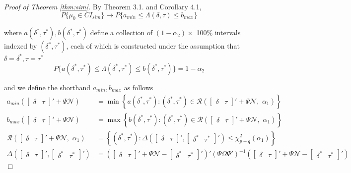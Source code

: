 \begin{proof}[Proof of Theorem \ref{thm:sim}]
By Theorem 3.1. and Corollary 4.1, 
\[
P\{ \mu_0 \in CI_{sim}\} \rightarrow P\{ a_{min} \leq \Lambda(\delta, \tau) \leq b_{max}\}
\]

where $a(\delta^{*}, \tau^{*}), b(\delta^{*}, \tau^{*})$ define a collection of $(1-\alpha_2) \times $ 100\% intervals indexed by $(\delta^{*}, \tau^{*})$, each of which is constructed under the assumption that $\delta=\delta^{*}, \tau=\tau^{*}$
\[
P\{a(\delta^{*},\tau^{*}) \leq \Lambda(\delta^{*}, \tau^{*})\leq b(\delta^{*}, \tau^{*})\} = 1-\alpha_2
\]

and we define the shorthand $a_{min}, b_{max}$ as follows
\begin{align*}
a_{min}\left( \begin{bmatrix}
\delta & \tau
\end{bmatrix}' + \Psi \mathscr{N} \right) &= \min\left \{ a(\delta^{*}, \tau^{*}): (\delta^{*}, \tau^{*}) \in \mathscr{R} \left( \begin{bmatrix}
\delta & \tau
\end{bmatrix}' + \Psi \mathscr{N}, \,\, \alpha_1 \right)  \right \}\\
b_{max}\left( \begin{bmatrix}
\delta & \tau
\end{bmatrix}' + \Psi \mathscr{N} \right) &= \max\left \{ b(\delta^{*}, \tau^{*}): (\delta^{*}, \tau^{*}) \in \mathscr{R} \left( \begin{bmatrix}
\delta & \tau
\end{bmatrix}' + \Psi \mathscr{N}, \,\, \alpha_1 \right)  \right \}\\
\mathscr{R}\left( \begin{bmatrix}
\delta & \tau
\end{bmatrix}' + \Psi \mathscr{N}, \,\, \alpha_1 \right ) &= \left \{ (\delta^{*}, \tau^{*}): \Delta \left( \begin{bmatrix}
\delta & \tau
\end{bmatrix}', \begin{bmatrix}
\delta^{*} & \tau^{*}
\end{bmatrix}' \right) \leq \chi_{p+q}^2(\alpha_1) \right \}\\
\Delta \left( \begin{bmatrix}
\delta & \tau
\end{bmatrix}', \begin{bmatrix}
\delta^{*} & \tau^{*}
\end{bmatrix}' \right)& = \left( \begin{bmatrix}
\delta & \tau
\end{bmatrix}' + \Psi \mathscr{N} - \begin{bmatrix}
\delta^{*} & \tau^{*}
\end{bmatrix}' \right)' (\Psi\Omega\Psi')^{-1}\left( \begin{bmatrix}
\delta & \tau
\end{bmatrix}' + \Psi \mathscr{N} - \begin{bmatrix}
\delta^{*} & \tau^{*}
\end{bmatrix}' \right)
\end{align*}


\end{proof}
